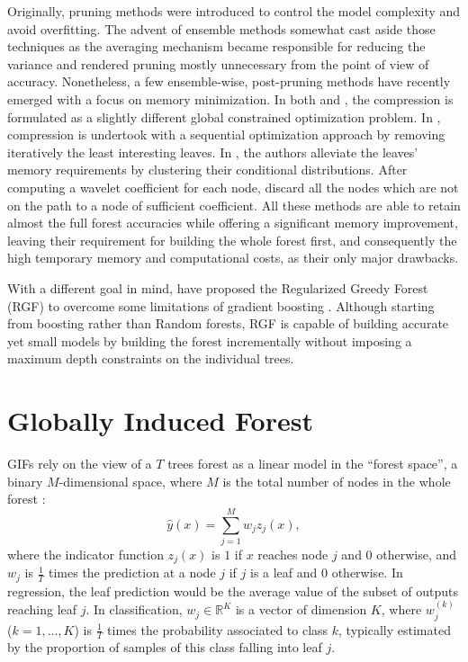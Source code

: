 \documentclass{article}
\begin{document}
Originally, pruning methods were introduced to control the model complexity and
avoid overfitting. The advent of ensemble methods somewhat cast aside those
techniques as the averaging mechanism became responsible for reducing the
variance and rendered pruning mostly unnecessary from the point of view of
accuracy. Nonetheless, a few ensemble-wise, post-pruning methods have recently
emerged with a focus on memory minimization. In both
\cite{meinshausen2009forestgarrote} and \cite{l1basedcomp}, the compression is
formulated as a slightly different global constrained optimization problem.  In
\cite{ren2015glorefinement}, compression is undertook with a sequential
optimization approach by removing iteratively the least interesting leaves.  In
\cite{vleeschouwer2015mitimemreq}, the authors alleviate the leaves' memory
requirements by clustering their conditional distributions. After computing a
wavelet coefficient for each node, \citet{elisha2016wavelet} discard all the
nodes which are not on the path to a node of sufficient coefficient.  All these
methods are able to retain almost the full forest accuracies while offering a
significant memory improvement, leaving their requirement for building the whole
forest first, and consequently the high temporary memory and computational
costs, as their only major drawbacks.

With a different goal in mind, \citet{johnson2014regforest} have proposed the 
Regularized Greedy Forest (RGF) to overcome some limitations of gradient 
boosting \cite{friedman2001gradboost}. Although starting from boosting rather 
than Random forests, RGF is capable of building accurate yet small models by 
building the forest incrementally without imposing a maximum depth constraints 
on the individual trees.

\section{Globally Induced Forest}
\label{sec:gif}

GIFs rely on the view of a $T$ trees forest as a linear model in the ``forest 
space'', a binary $M$-dimensional space, where $M$ is the total number of nodes 
in the whole forest \cite{l1basedcomp,vens2011random}:
%
\begin{equation}\label{eq:fs}
\hat{y}(x) =   \sum_{j=1}^{M} w_j z_j(x),
\end{equation}
where the indicator function $z_j(x)$ is $1$ if $x$ reaches node $j$ and $0$
otherwise, and $w_j$ is $\frac{1}{T}$ times the prediction at a node $j$ if $j$ 
is a leaf and $0$ otherwise. In regression, the leaf prediction would be the 
average value of the subset of outputs reaching leaf $j$. In classification, 
$w_j \in \mathbb{R}^K$ is a vector of dimension $K$, where $w_j^{(k)}$ 
($k=1,\ldots,K$) is $\frac{1}{T}$ times the probability associated to class 
$k$, typically estimated by the proportion of samples of this class falling 
into leaf $j$.
\end{document}
